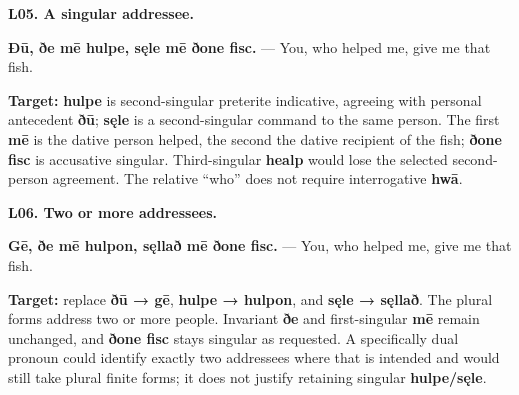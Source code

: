 \par\begin{minipage}{\linewidth}\raggedright
\textbf{L05. A singular addressee.}

\textbf{Ðū, ðe mē hulpe, sęle mē ðone fisc.} — You, who helped me, give me that fish.

\textbf{Target:} \textbf{hulpe} is second-singular preterite indicative, agreeing with personal antecedent \textbf{ðū}; \textbf{sęle} is a second-singular command to the same person. The first \textbf{mē} is the dative person helped, the second the dative recipient of the fish; \textbf{ðone fisc} is accusative singular. Third-singular \textbf{healp} would lose the selected second-person agreement. The relative “who” does not require interrogative \textbf{hwā}.

\end{minipage}\par\addvspace{4pt}

\par\begin{minipage}{\linewidth}\raggedright
\textbf{L06. Two or more addressees.}

\textbf{Gē, ðe mē hulpon, sęllað mē ðone fisc.} — You, who helped me, give me that fish.

\textbf{Target:} replace \textbf{ðū → gē}, \textbf{hulpe → hulpon}, and \textbf{sęle → sęllað}. The plural forms address two or more people. Invariant \textbf{ðe} and first-singular \textbf{mē} remain unchanged, and \textbf{ðone fisc} stays singular as requested. A specifically dual pronoun could identify exactly two addressees where that is intended and would still take plural finite forms; it does not justify retaining singular \textbf{hulpe/\allowbreak{}sęle}.

\end{minipage}\par\addvspace{4pt}

